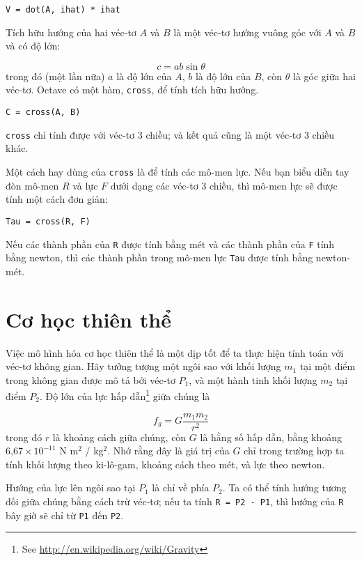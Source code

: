 \documentclass[12pt]{book}
\begin{document}
\begin{verbatim}
V = dot(A, ihat) * ihat
\end{verbatim}
%
Tích hữu hướng của hai véc-tơ $A$ và $B$ là một véc-tơ hướng 
vuông góc với $A$ và $B$ và có độ lớn:

\[ c = a b \sin \theta \]
%
trong đó (một lần nữa) $a$ là độ lớn của $A$, $b$ là độ lớn của 
$B$, còn $\theta$ là góc giữa hai véc-tơ.  Octave có một hàm, 
{\tt cross}, để tính tích hữu hướng.

\begin{verbatim}
C = cross(A, B)
\end{verbatim}
%
{\tt cross} chỉ tính được với véc-tơ 3 chiều; và kết quả cũng là một 
véc-tơ 3 chiều khác.

Một cách hay dùng của {\tt cross} là để tính các mô-men lực. Nếu bạn 
biểu diễn tay đòn mô-men $R$ và lực $F$ dưới dạng các véc-tơ 3
chiều, thì mô-men lực sẽ được tính một cách đơn giản:

\begin{verbatim}
Tau = cross(R, F)
\end{verbatim}

Nếu các thành phần của {\tt R} được tính bằng mét và các thành 
phần của {\tt F} tính bằng newton, thì các thành phần trong mô-men lực 
{\tt Tau} được tính bằng newton-mét.



\section{Cơ học thiên thể}

Việc mô hình hóa cơ học thiên thể là một dịp tốt để ta thực hiện tính 
toán với véc-tơ không gian. Hãy tưởng tượng một ngôi sao với 
khối lượng $m_1$ tại một điểm trong không gian được mô tả bởi 
véc-tơ $P_1$, và một hành tinh khối lượng $m_2$ tại điểm $P_2$.  
Độ lớn của lực hấp dẫn\footnote{See
\url{http://en.wikipedia.org/wiki/Gravity}} giữa chúng là 

\[ f_g = G \frac{m_1 m_2}{r^2}  \]
%
trong đó $r$ là khoảng cách giữa chúng, còn $G$ là hằng số hấp dẫn,
bằng khoảng $\mbox{6,67} \times 10^{-11}$ N m${}^2$ /
kg${}^2$.  Nhớ rằng đây là giá trị của $G$ chỉ trong trường hợp ta tính 
khối lượng theo ki-lô-gam, khoảng cách theo mét, và lực theo newton.

Hướng của lực lên ngôi sao tại $P_1$ là chỉ về phía $P_2$. Ta có thể 
tính hướng tương đối giữa chúng bằng cách trừ véc-tơ; nếu ta tính 
{\tt R = P2 - P1}, thì hướng của {\tt R} bây giờ sẽ chỉ từ {\tt P1} 
đến {\tt P2}.
\end{document}
